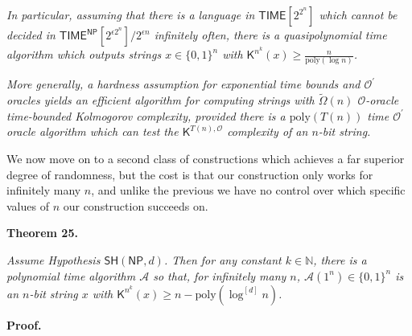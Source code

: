\emph{In particular, assuming that there is a language in ${\mathsf{TIME}}[2^{2^{n}}]$ which cannot be decided in ${\mathsf{TIME}}^{\mathsf{NP}}[2^{\epsilon 2^{n}}]/2^{\epsilon n}$ infinitely often, there is a quasipolynomial time algorithm which outputs strings $x\in\{0,1\}^{n}$ with ${\mathsf{K}}^{n^{k}}(x)\geq\frac{n}{\mathrm{poly}(\log n)}$.}\par




\emph{More generally, a hardness assumption for exponential time bounds and $\mathcal{O^{\prime}}$ oracles yields an efficient algorithm for computing strings with $\tilde{\Omega}(n)$ $\mathcal{O}$-oracle time-bounded Kolmogorov complexity, provided there is a $\mathrm{poly}(T(n))$ time $\mathcal{O^{\prime}}$ oracle algorithm which can test the ${\mathsf{K}}^{T(n),\mathcal{O}}$ complexity of an $n$-bit string.}\par






We now move on to a second class of constructions which achieves a far superior degree of randomness, but the cost is that our construction only works for infinitely many $n$, and unlike the previous we have no control over which specific values of $n$ our construction succeeds on.\par





\par\medskip\noindent\textbf{
\textbf{Theorem 25}\textbf{.}
}\par



\emph{Assume Hypothesis $\mathsf{SH}({\mathsf{NP}},d)$. Then for any constant $k\in\mathbb{N}$, there is a polynomial time algorithm $\mathcal{A}$ so that, for infinitely many $n$, $\mathcal{A}(1^{n})\in\{0,1\}^{n}$ is an $n$-bit string $x$ with ${\mathsf{K}}^{n^{k}}(x)\geq n-\mathrm{poly}(\log^{[d]}n)$.}\par







\par\medskip\noindent\textbf{Proof.}\par




